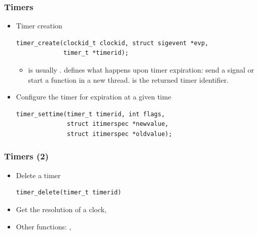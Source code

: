 \begin{frame}[fragile]
  \frametitle{Timers}
  \small
  \begin{itemize}
  \item Timer creation
    \begin{block}{}
\footnotesize
\begin{verbatim}
timer_create(clockid_t clockid, struct sigevent *evp,
             timer_t *timerid);
\end{verbatim}
\small
    \end{block}
    \begin{itemize}
    \item {} is usually
      .  defines what happens
      upon timer expiration: send a signal or start a function in a
      new thread.  is the returned timer identifier.
    \end{itemize}
  \item Configure the timer for expiration at a given time
    \begin{block}{}
\footnotesize
\begin{verbatim}
timer_settime(timer_t timerid, int flags,
              struct itimerspec *newvalue,
              struct itimerspec *oldvalue);
\end{verbatim}
\small
    \end{block}
  \end{itemize}
\end{frame}

\begin{frame}[fragile]
  \frametitle{Timers (2)}
  \begin{itemize}
  \item Delete a timer
    \begin{block}{}
\footnotesize
\begin{verbatim}
timer_delete(timer_t timerid)
\end{verbatim}
\small
    \end{block}
  \item Get the resolution of a clock, 
  \item Other functions: , 
  \end{itemize}
\end{frame}


